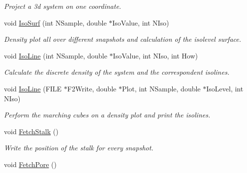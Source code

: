 \begin{DoxyCompactItemize}
\begin{DoxyCompactList}\small\item\em Project a 3d system on one coordinate. \end{DoxyCompactList}\item 
void \hyperlink{classElPoly_a23b08e53b2acd3090051d2034632c20f}{Iso\+Surf} (int N\+Sample, double $\ast$Iso\+Value, int N\+Iso)\hypertarget{classElPoly_a23b08e53b2acd3090051d2034632c20f}{}\label{classElPoly_a23b08e53b2acd3090051d2034632c20f}

\begin{DoxyCompactList}\small\item\em Density plot all over different snapshots and calculation of the isolevel surface. \end{DoxyCompactList}\item 
void \hyperlink{classElPoly_a7af346569b401863e3d5f4541e85e0c4}{Iso\+Line} (int N\+Sample, double $\ast$Iso\+Value, int N\+Iso, int How)\hypertarget{classElPoly_a7af346569b401863e3d5f4541e85e0c4}{}\label{classElPoly_a7af346569b401863e3d5f4541e85e0c4}

\begin{DoxyCompactList}\small\item\em Calculate the discrete density of the system and the correspondent isolines. \end{DoxyCompactList}\item 
void \hyperlink{classElPoly_a87faf7a81fea58a62dd97ee88b5b1b84}{Iso\+Line} (F\+I\+LE $\ast$F2\+Write, double $\ast$Plot, int N\+Sample, double $\ast$Iso\+Level, int N\+Iso)\hypertarget{classElPoly_a87faf7a81fea58a62dd97ee88b5b1b84}{}\label{classElPoly_a87faf7a81fea58a62dd97ee88b5b1b84}

\begin{DoxyCompactList}\small\item\em Perform the marching cubes on a density plot and print the isolines. \end{DoxyCompactList}\item 
void \hyperlink{classElPoly_a21a28de0471580af1978c3a48ae0ba0e}{Fetch\+Stalk} ()
\begin{DoxyCompactList}\small\item\em Write the position of the stalk for every snapshot. \end{DoxyCompactList}\item 
void \hyperlink{classElPoly_aecd33584d71ae498798338253cbf83f0}{Fetch\+Pore} ()\hypertarget{classElPoly_aecd33584d71ae498798338253cbf83f0}{}\label{classElPoly_aecd33584d71ae498798338253cbf83f0}


\end{DoxyCompactItemize}
